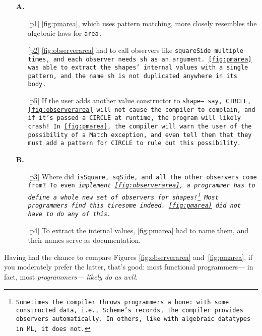 \documentclass[manuscript,screen,review, 12pt, nonacm]{acmart}
\begin{document}
    \begin{enumerate}
      \item [\textbf{A.}]
      \begin{enumerate}[label=\arabic*]
        \item[\ref{p1}] \ref{fig:pmarea}, which uses pattern matching, more
        closely resembles the algebraic laws for \tt{area}. 
        \item[\ref{p2}] \ref{fig:observerarea} had to call observers like
        \tt{squareSide} multiple times, and each observer needs \tt{sh} as an
        argument. \ref{fig:pmarea} was able to extract the \tt{shape}s' internal
        values with a single pattern, and the name \tt{sh} is not duplicated
        anywhere in its body. 
        \item[\ref{p5}] If the user adds another value constructor to
        \tt{shape}--- say, \tt{CIRCLE}, \ref{fig:observerarea} will not cause
        the compiler to complain, and if it's passed a \tt{CIRCLE} at runtime,
        the program will likely crash! In \ref{fig:pmarea}, the compiler will
        warn the user of the possibility of a \tt{Match} exception, and even
        tell them that they must add a pattern for \tt{CIRCLE} to rule out this
        possibility. 
    \end{enumerate}
      
    \item [\textbf{B.}]
      \begin{enumerate}[start=4, label=\arabic*]
        \item[\ref{p3}] Where did \tt{isSquare}, \tt{sqSide}, and all the other
        observers come from? To even \it{implement} \ref{fig:observerarea}, a
        programmer has to define a whole new set of observers for
        \tt{shape}s!\footnote{Sometimes the compiler throws programmers a bone:
        with some constructed data, i.e., Scheme's records, the compiler
        provides observers automatically. In others, like with algebraic
        datatypes in ML, it does not.} Most programmers find this tiresome
        indeed. \ref{fig:pmarea} did not have to do any of this.
        \item[\ref{p4}] To extract the internal values, \ref{fig:pmarea} had to
        name them, and their names serve as documentation. 
      \end{enumerate}
    \end{enumerate}


    Having had the chance to compare Figures \ref{fig:observerarea}
    and~\ref{fig:pmarea}, if you moderately prefer the latter, that's good: most
    functional programmers--- in fact, most \it{programmers}--- likely do as
    well. 
\end{document}
